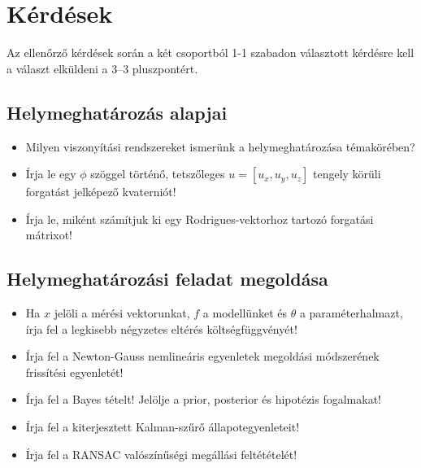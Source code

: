 \section{Kérdések}\label{sec:questions}
Az ellenőrző kérdések során a két csoportból 1-1 szabadon választott kérdésre kell a választ elküldeni a 3--3 pluszpontért.

\subsection{Helymeghatározás alapjai}
\begin{itemize}
	\item Milyen viszonyítási rendszereket ismerünk a helymeghatározása témakörében?
	\item Írja le egy $\phi$ szöggel történő, tetszőleges $u=\left[u_x,u_y,u_z\right]$ tengely körüli forgatást jelképező kvaterniót!
	\item Írja le, miként számítjuk ki egy Rodrigues-vektorhoz tartozó forgatási mátrixot!
\end{itemize}

\subsection{Helymeghatározási feladat megoldása}
\begin{itemize}
	\item Ha $x$ jelöli a mérési vektorunkat, $f$ a modellünket és $\theta$ a paraméterhalmazt, írja fel a legkisebb négyzetes eltérés költségfüggvényét!
	\item Írja fel a Newton-Gauss nemlineáris egyenletek megoldási módszerének frissítési egyenletét!
	\item Írja fel a Bayes tételt! Jelölje a prior, posterior és hipotézis fogalmakat!
	\item Írja fel a kiterjesztett Kalman-szűrő állapotegyenleteit!
	\item Írja fel a RANSAC valószínűségi megállási feltétételét!
\end{itemize}